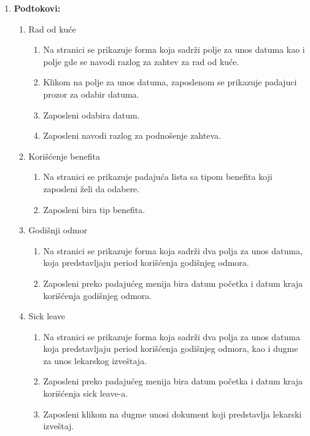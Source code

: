 \documentclass[a4paper]{article}
\begin{document}
\begin{enumerate}
    \item \textbf{Podtokovi:}
        \begin{enumerate}
            \item Rad od kuće
            \begin{enumerate}
                \item Na stranici se prikazuje forma koja sadrži polje za unos datuma kao i polje gde se navodi razlog za zahtev za rad od kuće.
                \item Klikom na polje za unos datuma, zaposlenom se prikazuje padajuci prozor za odabir datuma.
                \item Zaposleni odabira datum.
                \item Zaposleni navodi razlog za podnošenje zahteva. 
            \end{enumerate}
            \item Korišćenje benefita
            \begin{enumerate}
                \item Na stranici se prikazuje padajuća lista sa tipom benefita koji zaposleni želi da odabere.
                \item Zaposleni bira tip benefita.
            \end{enumerate}
            \item Godišnji odmor
            \begin{enumerate}
                \item Na stranici se prikazuje forma koja sadrži dva polja za unos datuma, koja predstavljaju period korišćenja godišnjeg odmora.
                \item Zaposleni preko padajućeg menija bira datum početka i datum kraja korišćenja godišnjeg odmora. 
            \end{enumerate}
            \item Sick leave
            \begin{enumerate}
                \item Na stranici se prikazuje forma koja sadrži dva polja za unos datuma koja predstavljaju period korišćenja godišnjeg odmora, kao i dugme za unos lekarskog izveštaja.
                \item Zaposleni preko padajućeg menija bira datum početka i datum kraja korišćenja sick leave-a.
                \item Zaposleni klikom na dugme unosi dokument koji predstavlja lekarski izveštaj.
            \end{enumerate}

\end{enumerate}
\end{enumerate}
\end{document}
